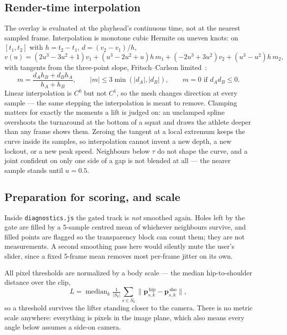 \documentclass[10pt,a4paper]{article}
\newcommand{\Lt}{L}                      %
\begin{document}
\subsection{Render-time interpolation}

The overlay is evaluated at the playhead's continuous time, not at the nearest
sampled frame. Interpolation is monotone cubic Hermite on uneven knots: on
$[t_1,t_2]$ with $h=t_2-t_1$, $d=(v_2-v_1)/h$,
\[
  v(u)=(2u^3-3u^2+1)v_1+(u^3-2u^2+u)h\,m_1+(-2u^3+3u^2)v_2+(u^3-u^2)h\,m_2 ,
\]
with tangents from the three-point slope, Fritsch--Carlson limited~\cite{fc}:
\[
  m=\frac{d_A h_B+d_B h_A}{h_A+h_B},\qquad
  |m|\le 3\min(|d_A|,|d_B|),\qquad
  m=0 \text{ if } d_A d_B\le 0 .
\]
Linear interpolation is $C^0$ but not $C^1$, so the mesh changes direction at
every sample --- the same stepping the interpolation is meant to remove.
Clamping matters for exactly the moments a lift is judged on: an unclamped
spline overshoots the turnaround at the bottom of a squat and draws the athlete
deeper than any frame shows them. Zeroing the tangent at a local extremum keeps
the curve inside its samples, so interpolation cannot invent a new depth, a new
lockout, or a new peak speed. Neighbours below $\tau$ do not shape the curve,
and a joint confident on only one side of a gap is not blended at all --- the
nearer sample stands until $u=0.5$.

\subsection{Preparation for scoring, and scale}

Inside \texttt{diagnostics.js} the gated track is \emph{not} smoothed again.
Holes left by the gate are filled by a 5-sample centred mean of whichever
neighbours survive, and filled points are flagged so the transparency block can
count them; they are not measurements. A second smoothing pass here would
silently mute the user's slider, since a fixed 5-frame mean removes most
per-frame jitter on its own.

All pixel thresholds are normalized by a body scale --- the median hip-to-shoulder
distance over the clip,
\[
  \Lt=\operatorname{median}_k \tfrac{1}{|S_k|}\textstyle\sum_{s\in S_k}\lVert \mathbf{p}^{\,\mathrm{hip}}_{s,k}-\mathbf{p}^{\,\mathrm{sho}}_{s,k}\rVert ,
\]
so a threshold survives the lifter standing closer to the camera. There is no
metric scale anywhere: everything is pixels in the image plane, which also means
every angle below assumes a side-on camera.
\end{document}
